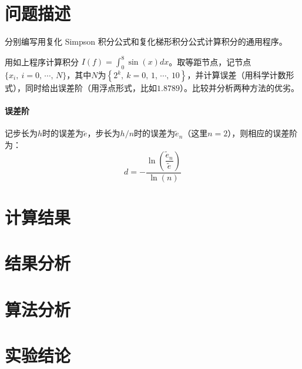 \documentclass[11pt]{article}
\begin{document}
\maketitle
\thispagestyle{empty}
\newpage

\section{问题描述}
分别编写用复化 Simpson 积分公式和复化梯形积分公式计算积分的通用程序。

用如上程序计算积分 $I(f) = \displaystyle \int_0^8\sin{(x)}dx$。取等距节点，记节点$\{x_i,\ i = 0,\,\cdots,\,N\}$，其中$N$为$\left\{2^k,\ k = 0,\,1,\,\cdots,\,10\right\}$，并计算误差（用科学计数形式），同时给出误差阶（用浮点形式，比如$1.8789$）。比较并分析两种方法的优劣。

\paragraph{误差阶} 记步长为$h$时的误差为$\widetilde{e}$，步长为$h/n$时的误差为$\widetilde{e}_n$（这里$n = 2$），则相应的误差阶为：
\begin{equation*}
    d = - \frac{\ln{\left(\dfrac{\widetilde{e}_n}{\widetilde{e}}\right)}}{\ln{(n)}}
\end{equation*}
\section{计算结果}

\section{结果分析}

\section{算法分析}

\section{实验结论}
\end{document}
